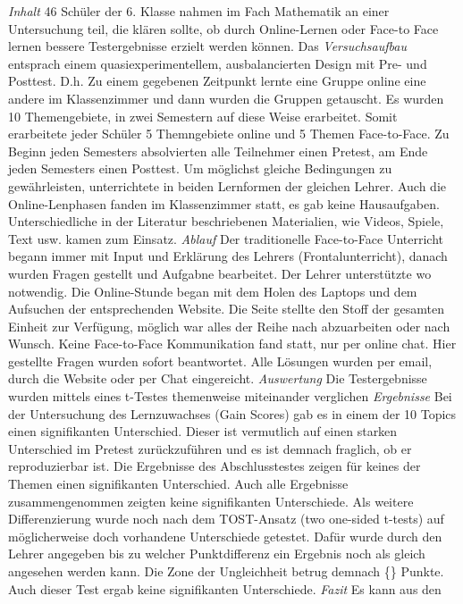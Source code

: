 \emph{Inhalt} 46 Schüler der 6. Klasse nahmen im Fach Mathematik an
einer Untersuchung teil, die klären sollte, ob durch Online-Lernen oder
Face-to Face lernen bessere Testergebnisse erzielt werden können. Das
\emph{Versuchsaufbau} entsprach einem quasiexperimentellem,
ausbalancierten Design mit Pre- und Posttest. D.h. Zu einem gegebenen
Zeitpunkt lernte eine Gruppe online eine andere im Klassenzimmer und
dann wurden die Gruppen getauscht. Es wurden 10 Themengebiete, in zwei
Semestern auf diese Weise erarbeitet. Somit erarbeitete jeder Schüler 5
Themngebiete online und 5 Themen Face-to-Face. Zu Beginn jeden Semesters
absolvierten alle Teilnehmer einen Pretest, am Ende jeden Semesters
einen Posttest. Um möglichst gleiche Bedingungen zu gewährleisten,
unterrichtete in beiden Lernformen der gleichen Lehrer. Auch die
Online-Lenphasen fanden im Klassenzimmer statt, es gab keine
Hausaufgaben. Unterschiedliche in der Literatur beschriebenen
Materialien, wie Videos, Spiele, Text usw. kamen zum Einsatz.
\emph{Ablauf} Der traditionelle Face-to-Face Unterricht begann immer mit
Input und Erklärung des Lehrers (Frontalunterricht), danach wurden
Fragen gestellt und Aufgabne bearbeitet. Der Lehrer unterstützte wo
notwendig. Die Online-Stunde began mit dem Holen des Laptops und dem
Aufsuchen der entsprechenden Website. Die Seite stellte den Stoff der
gesamten Einheit zur Verfügung, möglich war alles der Reihe nach
abzuarbeiten oder nach Wunsch. Keine Face-to-Face Kommunikation fand
statt, nur per online chat. Hier gestellte Fragen wurden sofort
beantwortet. Alle Lösungen wurden per email, durch die Website oder per
Chat eingereicht. \emph{Auswertung} Die Testergebnisse wurden mittels
eines t-Testes themenweise miteinander verglichen \emph{Ergebnisse} Bei
der Untersuchung des Lernzuwachses (Gain Scores) gab es in einem der 10
Topics einen signifikanten Unterschied. Dieser ist vermutlich auf einen
starken Unterschied im Pretest zurückzuführen und es ist demnach
fraglich, ob er reproduzierbar ist. Die Ergebnisse des Abschlusstestes
zeigen für keines der Themen einen signifikanten Unterschied. Auch alle
Ergebnisse zusammengenommen zeigten keine signifikanten Unterschiede.
Als weitere Differenzierung wurde noch nach dem TOST-Ansatz (two
one-sided t-tests) auf möglicherweise doch vorhandene Unterschiede
getestet. Dafür wurde durch den Lehrer angegeben bis zu welcher
Punktdifferenz ein Ergebnis noch als gleich angesehen werden kann. Die
Zone der Ungleichheit betrug demnach \{\} Punkte. Auch dieser Test
ergab keine signifikanten Unterschiede. \emph{Fazit} Es kann aus den
